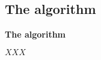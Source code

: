 \subsection{The \acronymATARIA{}{} algorithm \citep{creech2021dynamic}}
\label{appendix:algorithm-ataria}

\begin{algorithm}[ht]
	\DontPrintSemicolon
	\footnotesize
	
	\caption{\textbf{The \acronymATARIA{}{} algorithm}}
	\label{alg:ataria}
	{

		\nonl
		\;
		$XXX$ \;
	}
\end{algorithm}